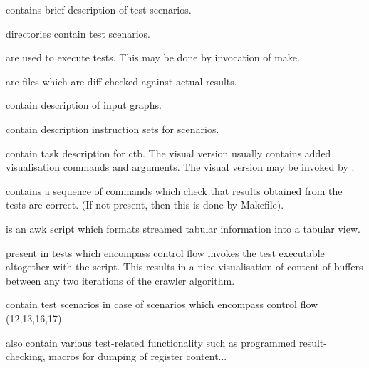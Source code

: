 \begin{description}
  \item {} contains brief description of test scenarios.
  \item {} directories contain test scenarios.
  \item {} are used to execute tests. This may be done by invocation of make.
  \item {} are files which are diff-checked against actual results.
  \item {} contain description of input graphs.
  \item {} contain description instruction sets for scenarios. 
  \item {} contain task description for ctb. The visual version usually contains added visualisation commands and arguments. The visual version may be invoked by .
  \item {} contains a sequence of commands which check that results obtained from the tests are correct. (If not present, then this is done by Makefile).
  \item {} is an awk script which formats streamed tabular information into a tabular view. 
  \item {} present in tests which encompass control flow invokes the test executable altogether with the  script. This results in a nice visualisation of content of buffers between any two iterations of the crawler algorithm.
  \item {} contain test scenarios in case of scenarios which encompass control flow (12,13,16,17).
  \item {} also contain various test-related functionality such as programmed result-checking, macros for dumping of register content...
\end{description}


